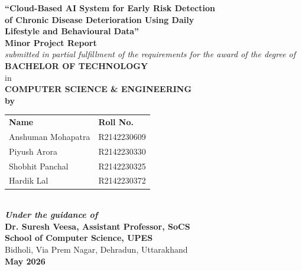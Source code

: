 \documentclass[12pt,a4paper]{report}
\begin{document}
\begin{titlepage}
\thispagestyle{empty}
\begin{center}

\vspace*{0.3cm}
{\Large \textbf{``Cloud-Based AI System for Early Risk Detection}}\\[4pt]
{\Large \textbf{of Chronic Disease Deterioration Using Daily}}\\[4pt]
{\Large \textbf{Lifestyle and Behavioural Data''}}\\[16pt]

{\large \textbf{Minor Project Report}}\\[8pt]

{\normalsize \textit{submitted in partial fulfillment of the requirements for the award of the degree of}}\\[10pt]

{\LARGE \textbf{BACHELOR OF TECHNOLOGY}}\\[4pt]
{\large in}\\[4pt]
{\Large \textbf{COMPUTER SCIENCE \& ENGINEERING}}\\[20pt]

{\large \textbf{by}}\\[12pt]

\begin{tabular}{ll}
\textbf{Name} & \textbf{Roll No.}\\[6pt]
Anshuman Mohapatra & R2142230609\\[4pt]
Piyush Arora        & R2142230330\\[4pt]
Shobhit Panchal     & R2142230325\\[4pt]
Hardik Lal          & R2142230372\\
\end{tabular}\\[24pt]

\textit{\textbf{Under the guidance of}}\\[8pt]

{\large \textbf{Dr. Suresh Veesa, Assistant Professor, SoCS}}\\[6pt]

{\large \textbf{School of Computer Science, UPES}}\\[4pt]
Bidholi, Via Prem Nagar, Dehradun, Uttarakhand\\[20pt]

{\large \textbf{May 2026}}

\end{center}
\end{titlepage}
\end{document}
